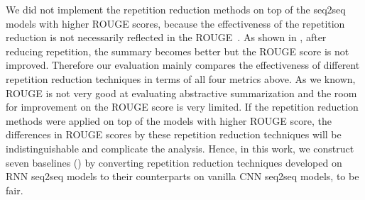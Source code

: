 \begin{table}[th!]
\begin{center}
\scriptsize
\caption{Example of generated summaries}
\qquad
{}
\label{tab:compete_exp}
\end{center}
\end{table}

We did not implement the repetition reduction methods 
on top of the seq2seq models with higher ROUGE scores,
because the effectiveness of the repetition reduction is not necessarily
reflected in the ROUGE~\citep{SeeLM17, PaulusXS17, FanGA18}.
As shown in , 
after reducing repetition, the summary becomes better
but the ROUGE score is not improved. 
Therefore our evaluation mainly compares
the effectiveness of different repetition reduction techniques
in terms of all four metrics above.
As we known, ROUGE is not very good at evaluating abstractive summarization
and the room for improvement on the ROUGE score is very limited.
If the repetition reduction methods 
were applied on top of the models with higher ROUGE score, 
the differences in ROUGE scores by these repetition reduction techniques will be
indistinguishable and complicate the analysis. 
Hence, in this work, 
we construct seven baselines ()
by converting
repetition reduction techniques developed on RNN seq2seq models to their
counterparts on vanilla CNN seq2seq models,
to be fair.

